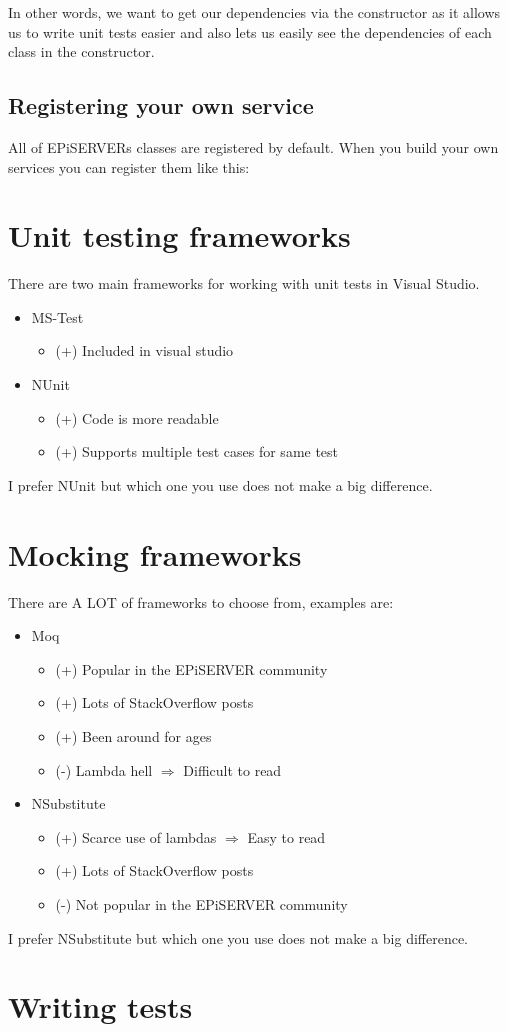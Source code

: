 \documentclass[12pt]{article}
\begin{document}
In other words, we want to get our dependencies via the constructor as it allows us to write unit tests easier and also lets us easily see the dependencies of each class in the constructor.

\subsection{Registering your own service}
All of EPiSERVERs classes are registered by default. When you build your own services you can register them like this:


\section{Unit testing frameworks}
There are two main frameworks for working with unit tests in Visual Studio.
\begin{itemize}
	\item MS-Test
	\begin{itemize}
		\item (+) Included in visual studio
	\end{itemize}
	\item NUnit
	\begin{itemize}
		\item (+) Code is more readable
		\item (+) Supports multiple test cases for same test
	\end{itemize}
\end{itemize}

I prefer NUnit but which one you use does not make a big difference.

\section{Mocking frameworks}
There are A LOT of frameworks to choose from, examples are:
\begin{itemize}
	\item Moq
	\begin{itemize}
		\item (+) Popular in the EPiSERVER community
		\item (+) Lots of StackOverflow posts
		\item (+) Been around for ages
		\item (-) Lambda hell $\Rightarrow$ Difficult to read
	\end{itemize}
	\item NSubstitute
	\begin{itemize}
		\item (+) Scarce use of lambdas $\Rightarrow$ Easy to read
		\item (+) Lots of StackOverflow posts
		\item (-) Not popular in the EPiSERVER community
	\end{itemize}
\end{itemize}

I prefer NSubstitute but which one you use does not make a big difference.

\section{Writing tests}
\end{document}
